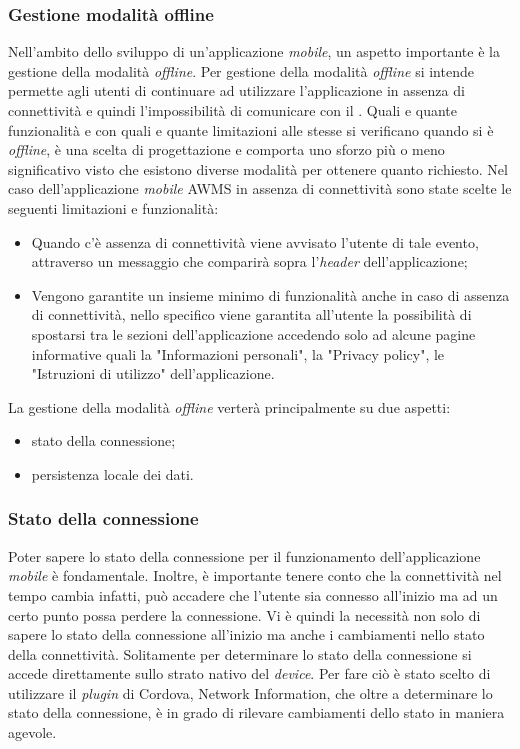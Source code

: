 \subsubsection{Gestione modalità offline}	
Nell'ambito dello sviluppo di un'applicazione \emph{mobile}, un aspetto importante è la gestione della modalità \emph{offline}. Per gestione della modalità \emph{offline} si intende permette agli utenti di continuare ad utilizzare l'applicazione in assenza di connettività e quindi l'impossibilità di comunicare con il . Quali e quante funzionalità e con quali e quante limitazioni alle stesse si verificano quando si è \emph{offline}, è una scelta di progettazione e comporta uno sforzo più o meno significativo visto che esistono diverse modalità per ottenere quanto richiesto. Nel caso dell'applicazione \emph{mobile} \gls{AWMS} in assenza di connettività sono state scelte le seguenti limitazioni e funzionalità:
\begin{itemize}
	\item Quando c'è assenza di connettività viene avvisato l'utente di tale evento, attraverso un messaggio che comparirà sopra l'\emph{header} dell'applicazione;
	\item Vengono garantite un insieme minimo di funzionalità anche in caso di assenza di connettività, nello specifico viene garantita all'utente la possibilità di spostarsi tra le sezioni dell'applicazione accedendo solo ad alcune pagine informative quali la "Informazioni personali", la "Privacy policy", le "Istruzioni di utilizzo" dell'applicazione.
\end{itemize}

La gestione della modalità \emph{offline} verterà principalmente su due aspetti:
\begin{itemize}
	\item stato della connessione;
	\item persistenza locale dei dati.
\end{itemize}
\subsubsection{Stato della connessione}
Poter sapere lo stato della connessione per il funzionamento dell'applicazione \emph{mobile} è fondamentale. Inoltre, è importante tenere conto che la connettività nel tempo cambia infatti, può accadere che l'utente sia connesso all'inizio ma ad un certo punto possa perdere la connessione. Vi è quindi la necessità non solo di sapere lo stato della connessione all'inizio ma anche i cambiamenti nello stato della connettività. Solitamente per determinare lo stato della connessione si accede direttamente sullo strato nativo del \emph{device}. Per fare ciò è stato scelto di utilizzare il \emph{plugin} di Cordova, Network Information, che oltre a determinare lo stato della connessione, è in grado di rilevare cambiamenti dello stato in maniera agevole.

